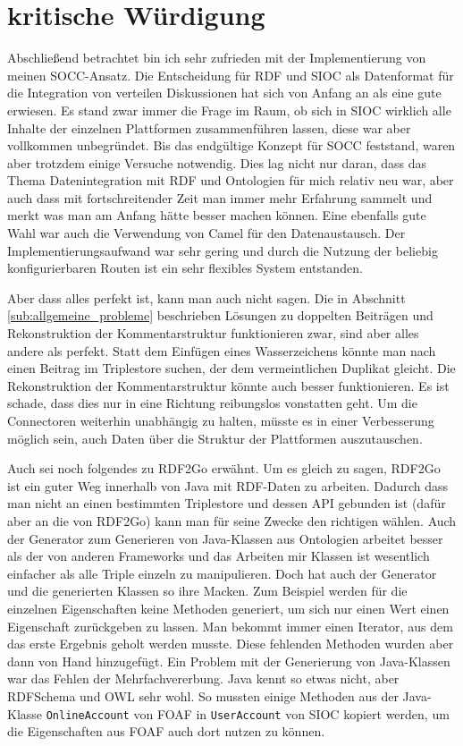 \section{kritische Würdigung} %
\label{sec:bewertung}

Abschließend betrachtet bin ich sehr zufrieden mit der Implementierung von meinen SOCC-Ansatz. Die Entscheidung für RDF und SIOC als Datenformat für die Integration von verteilen Diskussionen hat sich von Anfang an als eine gute erwiesen. Es stand zwar immer die Frage im Raum, ob sich in SIOC wirklich alle Inhalte der einzelnen Plattformen zusammenführen lassen, diese war aber vollkommen unbegründet. Bis das endgültige Konzept für SOCC feststand, waren aber trotzdem einige Versuche notwendig. Dies lag nicht nur daran, dass das Thema Datenintegration mit RDF und Ontologien für mich relativ neu war, aber auch dass mit fortschreitender Zeit man immer mehr Erfahrung sammelt und merkt was man am Anfang hätte besser machen können. Eine ebenfalls gute Wahl war auch die Verwendung von Camel für den Datenaustausch. Der Implementierungsaufwand war sehr gering und durch die Nutzung der beliebig konfigurierbaren Routen ist ein sehr flexibles System entstanden. 

Aber dass alles perfekt ist, kann man auch nicht sagen. Die in Abschnitt \ref{sub:allgemeine_probleme} beschrieben Lösungen zu doppelten Beiträgen und Rekonstruktion der Kommentarstruktur funktionieren zwar, sind aber alles andere als perfekt. Statt dem Einfügen eines Wasserzeichens könnte man nach einen Beitrag im Triplestore suchen, der dem vermeintlichen Duplikat gleicht. Die Rekonstruktion der Kommentarstruktur könnte auch besser funktionieren. Es ist schade, dass dies nur in eine Richtung reibungslos vonstatten geht. Um die Connectoren weiterhin unabhängig zu halten, müsste es in einer Verbesserung möglich sein, auch Daten über die Struktur der Plattformen auszutauschen. 

Auch sei noch folgendes zu RDF2Go erwähnt. Um es gleich zu sagen, RDF2Go ist ein guter Weg innerhalb von Java mit RDF-Daten zu arbeiten. Dadurch dass man nicht an einen bestimmten Triplestore und dessen API gebunden ist (dafür aber an die von RDF2Go) kann man für seine Zwecke den richtigen wählen. Auch der Generator zum Generieren von Java-Klassen aus Ontologien arbeitet besser als der von anderen Frameworks und das Arbeiten mir Klassen ist wesentlich einfacher als alle Triple einzeln zu manipulieren. Doch hat auch der Generator und die generierten Klassen so ihre Macken. Zum Beispiel werden für die einzelnen Eigenschaften keine Methoden generiert, um sich nur einen Wert einen Eigenschaft zurückgeben zu lassen. Man bekommt immer einen Iterator, aus dem das erste Ergebnis geholt werden musste. Diese fehlenden Methoden wurden aber dann von Hand hinzugefügt. Ein Problem mit der Generierung von Java-Klassen war das Fehlen der Mehrfachvererbung. Java kennt so etwas nicht, aber RDFSchema und OWL sehr wohl. So mussten einige Methoden aus der Java-Klasse \texttt{OnlineAccount} von FOAF in \texttt{UserAccount} von SIOC kopiert werden, um die Eigenschaften aus FOAF auch dort nutzen zu können.

